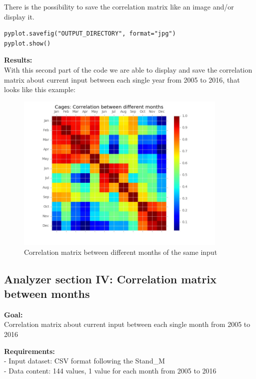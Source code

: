 There is the possibility to save the correlation matrix like an image and/or display it.
\begin{lstlisting}
pyplot.savefig("OUTPUT_DIRECTORY", format="jpg")
pyplot.show()
\end{lstlisting}

\begin{minipage}{0.5\textwidth}
\textbf{Results:} \\
With this second part of the code we are able to display and save the correlation matrix about current input between each single year from 2005 to 2016, that looks like this example:
\end{minipage} \hfill
\begin{minipage}{0.45\textwidth}
\begin{figure}[H]
    \includegraphics[width=0.9\textwidth]{Files/Cages_Months_Matrix.jpg}
    \caption{Correlation matrix between different months of the same input}
\end{figure}
\end{minipage}



\newpage
\subsection{Analyzer section IV: Correlation matrix between months}

\textbf{Goal:}\\
Correlation matrix about current input between each single month from 2005 to 2016

\textbf{Requirements:}\\
- Input dataset: CSV format following the Stand\_M \\
- Data content: 144 values, 1 value for each month from 2005 to 2016

